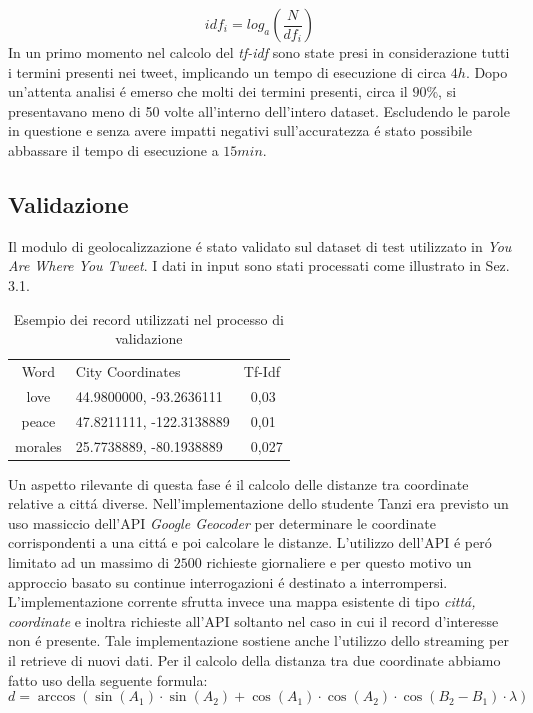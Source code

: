 \documentclass[twocolumn,10pt]{asme2ej}
\begin{document}
$$idf_i= log_{a}\left ( \frac{N}{df_i} \right )$$
In un primo momento nel calcolo del \textit{tf-idf} sono state presi in considerazione tutti i termini presenti nei tweet, implicando un tempo di esecuzione di circa $4h$. Dopo un'attenta analisi \'e emerso che molti dei termini presenti, circa il $90\%$, si presentavano meno di 50 volte all'interno dell'intero dataset. Escludendo le parole in questione e senza avere impatti negativi sull'accuratezza \'e stato possibile abbassare il tempo di esecuzione a $15 min$. 


\subsection{Validazione}

Il modulo di geolocalizzazione \'e stato validato sul dataset di test utilizzato in \textit{You Are Where You Tweet}. I dati in input sono stati processati come illustrato in Sez. 3.1. 
\begin{table}[t]
\caption{Esempio dei record utilizzati nel processo di validazione}
\begin{center}
\label{table_ASME}
\begin{tabular}{c l l}
& & \\ %
\hline
Word & City Coordinates &  Tf-Idf \\
\hline
love & 44.9800000, -93.2636111 & \ 0,03\\
peace &  47.8211111, -122.3138889 & \ 0,01 \\
morales & 25.7738889, -80.1938889 & \ 0,027 \\

\hline
\end{tabular}
\end{center}
\end{table}

Un aspetto rilevante di questa fase \'e il calcolo delle distanze tra coordinate relative a citt\'a diverse. Nell'implementazione dello studente Tanzi era previsto un uso massiccio dell'API \textit{Google Geocoder} per determinare le coordinate corrispondenti a una citt\'a e poi calcolare le distanze. L'utilizzo dell'API \'e per\'o limitato ad un massimo di $2500$ richieste giornaliere e per questo motivo un approccio basato su continue interrogazioni \'e destinato a interrompersi. L'implementazione corrente sfrutta invece una mappa esistente di tipo \textit{citt\'a, coordinate} e inoltra richieste all'API soltanto nel caso in cui il record d'interesse non \'e presente. Tale implementazione sostiene anche l'utilizzo dello streaming per il retrieve di nuovi dati. Per il calcolo della distanza tra due coordinate abbiamo fatto uso della seguente formula: 
$$d=  \arccos{\left ( \sin{\left (A_1 \right )} \cdot \sin{\left (A_2 \right )} + \cos{\left (A_1 \right )} \cdot \cos{\left (A_2 \right )} \cdot \cos{\left (B_2 - B_1 \right )} \cdot \lambda \right ) }$$
\end{document}
